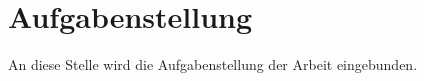 \newpage
\chapter*{Aufgabenstellung}
An diese Stelle wird die Aufgabenstellung der Arbeit eingebunden.
